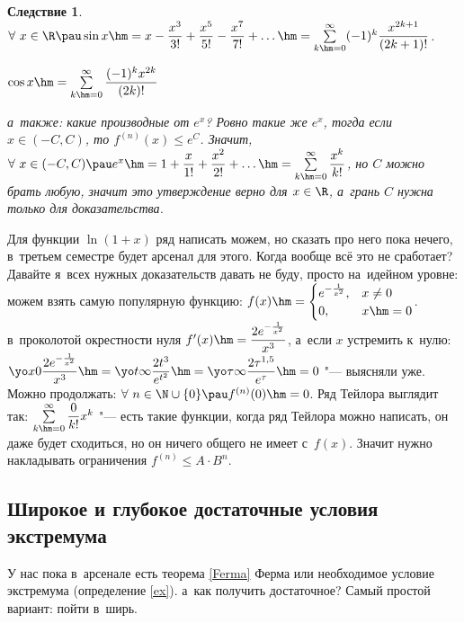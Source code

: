 \documentclass[a4paper,10pt,twoside]{article}
\newtheorem{Sl}{Следствие}[section]
\begin{document}
\begin{Sl}
    $\forall\  x\in\R\pau \sin x\hm=x-\dfrac{x^3}{3!}+\dfrac{x^5}{5!}-\dfrac{x^7}{7!}+\ldots\hm=\sum\limits_{k\hm=0}^\infty(-1)^k\dfrac{x^{2k+1}}{(2k+1)!}$.

    $\cos x\hm=\sum\limits_{k\hm=0}^\infty\dfrac{(-1)^kx^{2k}}{(2k)!}$

    а~также: какие производные от $e^x$? Ровно такие же $e^x$, тогда если $x\in(-C,C)$, то $f^{(n)}(x)\leq e^C$. Значит,
     $\forall\  x\in(-C,C)\pau e^x\hm=1+\dfrac{x}{1!}+\dfrac{x^2}{2!}+\ldots\hm=\sum\limits_{k\hm=0}^\infty\dfrac{x^k}{k!}$, но $C$ можно брать любую, значит это
    утверждение верно для $x\in\R$, а~грань $C$ нужна только для доказательства.
\end{Sl}

Для функции $\ln (1+x)$ ряд написать можем, но сказать про него пока нечего, в~третьем семестре будет арсенал для этого. Когда вообще всё это не сработает?
Давайте я~всех нужных доказательств давать не буду, просто на~идейном уровне: можем взять самую популярную функцию:
$f(x)\hm=\begin{cases}
    e^{-\frac1{x^2}},&x\neq0\\
    0,&x\hm=0
\end{cases}$.
\\    в~проколотой окрестности нуля $f'(x)\hm=\dfrac{2e^{-\frac1{x^2}}}{x^3}$, а~если $x$ устремить к~нулю: $\yo x0\dfrac{2e^{-\frac1{x^2}}}{x^3}\hm=
\yo t\infty\dfrac{2t^3}{e^{t^2}}\hm=\yo \tau\infty\dfrac{2\tau^{1{,}5}}{e^\tau}\hm=0$ "--- выясняли уже. Можно продолжать: $\forall\  n\in\N\cup\{0\}\pau
f^{(n)}(0)\hm=0$. Ряд Тейлора выглядит так: $\sum\limits_{k\hm=0}^\infty\dfrac0{k!}x^k$ "--- есть такие функции, когда ряд Тейлора можно написать, он даже будет сходиться,
но он ничего общего не имеет с~$f(x)$. Значит нужно накладывать ограничения $f^{(n)}\leq A\cdot B^n$.

\subsection{Широкое и глубокое достаточные условия экстремума}

У нас пока в~арсенале есть теорема \ref{Ferma} Ферма или необходимое условие экстремума (определение \ref{ex}). а~как получить достаточное? Самый простой вариант: пойти в~ширь.
\end{document}
